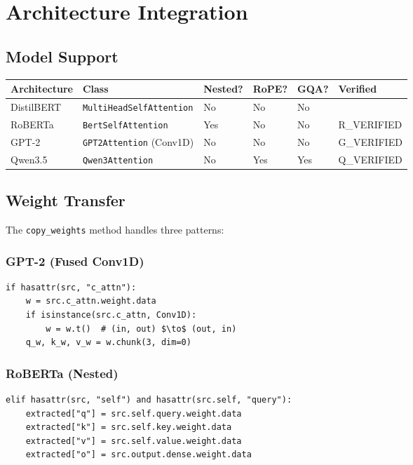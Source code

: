 
\section{Architecture Integration}

\subsection{Model Support}

\begin{table}[H]
\centering
\small
\begin{tabular}{llllll}
\toprule
\textbf{Architecture} & \textbf{Class} & \textbf{Nested?} & \textbf{RoPE?} & \textbf{GQA?} & \textbf{Verified} \\
\midrule
DistilBERT & \texttt{MultiHeadSelfAttention} & No & No & No &  \\
RoBERTa & \texttt{BertSelfAttention} & Yes & No & No & {{R\_VERIFIED}} \\
GPT-2 & \texttt{GPT2Attention} (Conv1D) & No & No & No & {{G\_VERIFIED}} \\
Qwen3.5 & \texttt{Qwen3Attention} & No & Yes & Yes & {{Q\_VERIFIED}} \\
\bottomrule
\end{tabular}
\end{table}

\subsection{Weight Transfer}

The \texttt{copy\_weights} method handles three patterns:

\subsubsection{GPT-2 (Fused Conv1D)}

\begin{lstlisting}
if hasattr(src, "c_attn"):
    w = src.c_attn.weight.data
    if isinstance(src.c_attn, Conv1D):
        w = w.t()  # (in, out) $\to$ (out, in)
    q_w, k_w, v_w = w.chunk(3, dim=0)
\end{lstlisting}

\subsubsection{RoBERTa (Nested)}

\begin{lstlisting}
elif hasattr(src, "self") and hasattr(src.self, "query"):
    extracted["q"] = src.self.query.weight.data
    extracted["k"] = src.self.key.weight.data
    extracted["v"] = src.self.value.weight.data
    extracted["o"] = src.output.dense.weight.data
\end{lstlisting}

